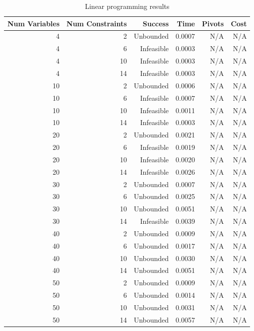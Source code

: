 \begin{table}[ht]
    \centering
    \begin{tabular}{rrrrrr}
        \toprule
        Num Variables & Num Constraints & Success & Time & Pivots & Cost \\
        \midrule
        4 & 2 & Unbounded & 0.0007 & N/A & N/A \\
		4 & 6 & Infeasible & 0.0003 & N/A & N/A \\
		4 & 10 & Infeasible & 0.0003 & N/A & N/A \\
		4 & 14 & Infeasible & 0.0003 & N/A & N/A \\
		10 & 2 & Unbounded & 0.0006 & N/A & N/A \\
		10 & 6 & Infeasible & 0.0007 & N/A & N/A \\
		10 & 10 & Infeasible & 0.0011 & N/A & N/A \\
		10 & 14 & Infeasible & 0.0003 & N/A & N/A \\
		20 & 2 & Unbounded & 0.0021 & N/A & N/A \\
		20 & 6 & Infeasible & 0.0019 & N/A & N/A \\
		20 & 10 & Infeasible & 0.0020 & N/A & N/A \\
		20 & 14 & Infeasible & 0.0026 & N/A & N/A \\
		30 & 2 & Unbounded & 0.0007 & N/A & N/A \\
		30 & 6 & Unbounded & 0.0025 & N/A & N/A \\
		30 & 10 & Unbounded & 0.0051 & N/A & N/A \\
		30 & 14 & Infeasible & 0.0039 & N/A & N/A \\
		40 & 2 & Unbounded & 0.0009 & N/A & N/A \\
		40 & 6 & Unbounded & 0.0017 & N/A & N/A \\
		40 & 10 & Unbounded & 0.0030 & N/A & N/A \\
		40 & 14 & Unbounded & 0.0051 & N/A & N/A \\
		50 & 2 & Unbounded & 0.0009 & N/A & N/A \\
		50 & 6 & Unbounded & 0.0014 & N/A & N/A \\
		50 & 10 & Unbounded & 0.0031 & N/A & N/A \\
		50 & 14 & Unbounded & 0.0057 & N/A & N/A \\
        \bottomrule
    \end{tabular}
    \caption{Linear programming results}
    \label{tab:lp-results}
\end{table}
